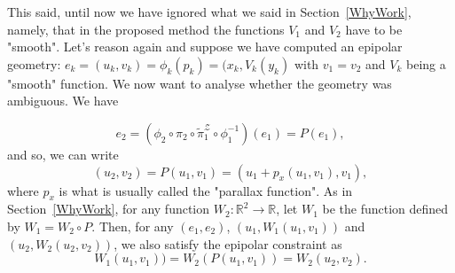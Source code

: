 \documentclass{ipol}
\newcommand{\RR}{\ensuremath{\mathbb{R}}}
\newcommand{\PiZVert}{\widetilde{\pi}_1^{\mathcal{Z}} }
\begin{document}
This said, until now we have ignored what we said in Section~\ref{WhyWork}, namely, that in the proposed method the functions $V_1$ and $V_2$ have to be "smooth". Let's reason again and suppose we have computed an epipolar geometry: $e_k=(u_k,v_k)=\phi_k(p_k) = (x_k,V_k(y_k)$ with $v_1=v_2$ and $V_k$ being a "smooth" function. We now want to analyse whether the geometry was ambiguous. We have 

\begin{equation*}
e_2 = (\phi_2 \circ  \pi_2 \circ  \PiZVert \circ  \phi_1^{-1}) (e_1) = P(e_1), 
\end{equation*}
and so, we can write
\begin{equation*}
(u_2,v_2) = P(u_1,v_1) = (u_1 + p_x(u_1,v_1),v_1),
\end{equation*}
%
where $p_x$ is what is usually called the "parallax function". As in Section~\ref{WhyWork}, for any function $W_2 : \RR^2 \rightarrow \RR  $, let $W_1$ be the function defined by $W_1 = W_2 \circ P$. Then, for any $(e_1,e_2)$, $(u_1,W_1(u_1,v_1))$ and $(u_2,W_2(u_2,v_2))$, we also satisfy the epipolar constraint as
\begin{equation*}
W_1(u_1,v_1)) = W_2 (P(u_1,v_1)) = W_2(u_2,v_2).
\end{equation*}

\end{document}
